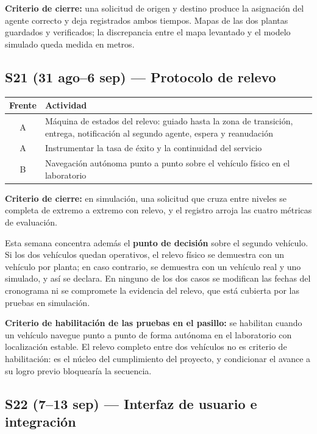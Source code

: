 \documentclass[12pt,letterpaper]{article}
\begin{document}
\textbf{Criterio de cierre:} una solicitud de origen y destino produce la asignación del agente correcto y deja registrados ambos tiempos. Mapas de las dos plantas guardados y verificados; la discrepancia entre el mapa levantado y el modelo simulado queda medida en metros.

\subsection{S21 (31 ago--6 sep) --- Protocolo de relevo}

\begin{table}[H]
    \centering
    \small
    \begin{tabular}{@{}cp{12.8cm}@{}}
        \toprule
        \textbf{Frente} & \textbf{Actividad} \\ \midrule
        A & Máquina de estados del relevo: guiado hasta la zona de transición, entrega, notificación al segundo agente, espera y reanudación \\
        A & Instrumentar la tasa de éxito y la continuidad del servicio \\
        B & Navegación autónoma punto a punto sobre el vehículo físico en el laboratorio \\ \bottomrule
    \end{tabular}
\end{table}

\textbf{Criterio de cierre:} en simulación, una solicitud que cruza entre niveles se completa de extremo a extremo con relevo, y el registro arroja las cuatro métricas de evaluación.

Esta semana concentra además el \textbf{punto de decisión} sobre el segundo vehículo. Si los dos vehículos quedan operativos, el relevo físico se demuestra con un vehículo por planta; en caso contrario, se demuestra con un vehículo real y uno simulado, y así se declara. En ninguno de los dos casos se modifican las fechas del cronograma ni se compromete la evidencia del relevo, que está cubierta por las pruebas en simulación.

\textbf{Criterio de habilitación de las pruebas en el pasillo:} se habilitan cuando un vehículo navegue punto a punto de forma autónoma en el laboratorio con localización estable. El relevo completo entre dos vehículos no es criterio de habilitación: es el núcleo del cumplimiento del proyecto, y condicionar el avance a su logro previo bloquearía la secuencia.

\subsection{S22 (7--13 sep) --- Interfaz de usuario e integración}
\end{document}
